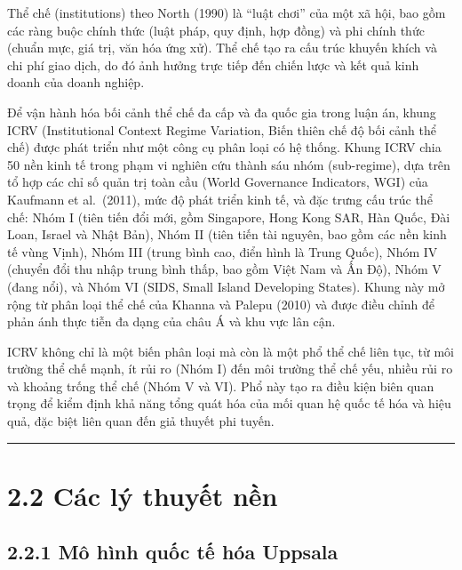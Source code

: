 \documentclass[
  a4paper,
  13pt]{extreport}
\begin{document}
Thể chế (institutions) theo North (1990) là ``luật chơi'' của một xã
hội, bao gồm các ràng buộc chính thức (luật pháp, quy định, hợp đồng) và
phi chính thức (chuẩn mực, giá trị, văn hóa ứng xử). Thể chế tạo ra cấu
trúc khuyến khích và chi phí giao dịch, do đó ảnh hưởng trực tiếp đến
chiến lược và kết quả kinh doanh của doanh nghiệp.

Để vận hành hóa bối cảnh thể chế đa cấp và đa quốc gia trong luận án,
khung ICRV (Institutional Context Regime Variation, Biến thiên chế độ
bối cảnh thể chế) được phát triển như một công cụ phân loại có hệ thống.
Khung ICRV chia 50 nền kinh tế trong phạm vi nghiên cứu thành sáu nhóm
(sub-regime), dựa trên tổ hợp các chỉ số quản trị toàn cầu (World
Governance Indicators, WGI) của Kaufmann et al.~(2011), mức độ phát
triển kinh tế, và đặc trưng cấu trúc thể chế: Nhóm I (tiên tiến đổi mới,
gồm Singapore, Hong Kong SAR, Hàn Quốc, Đài Loan, Israel và Nhật Bản),
Nhóm II (tiên tiến tài nguyên, bao gồm các nền kinh tế vùng Vịnh), Nhóm
III (trung bình cao, điển hình là Trung Quốc), Nhóm IV (chuyển đổi thu
nhập trung bình thấp, bao gồm Việt Nam và Ấn Độ), Nhóm V (đang nổi), và
Nhóm VI (SIDS, Small Island Developing States). Khung này mở rộng từ
phân loại thể chế của Khanna và Palepu (2010) và được điều chỉnh để phản
ánh thực tiễn đa dạng của châu Á và khu vực lân cận.

ICRV không chỉ là một biến phân loại mà còn là một phổ thể chế liên tục,
từ môi trường thể chế mạnh, ít rủi ro (Nhóm I) đến môi trường thể chế
yếu, nhiều rủi ro và khoảng trống thể chế (Nhóm V và VI). Phổ này tạo ra
điều kiện biên quan trọng để kiểm định khả năng tổng quát hóa của mối
quan hệ quốc tế hóa và hiệu quả, đặc biệt liên quan đến giả thuyết phi
tuyến.

\begin{center}\rule{0.5\linewidth}{0.5pt}\end{center}

\hypertarget{cuxe1c-luxfd-thuyux1ebft-nux1ec1n}{%
\section{2.2 Các lý thuyết
nền}\label{cuxe1c-luxfd-thuyux1ebft-nux1ec1n}}

\hypertarget{muxf4-huxecnh-quux1ed1c-tux1ebf-huxf3a-uppsala}{%
\subsection{2.2.1 Mô hình quốc tế hóa
Uppsala}\label{muxf4-huxecnh-quux1ed1c-tux1ebf-huxf3a-uppsala}}
\end{document}
